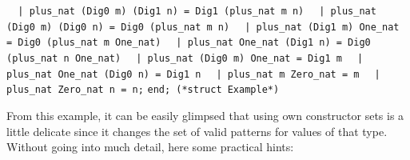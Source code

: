 \begin{isabellebody}
\begin{isamarkuptext}
\verb|  |\verb,|,\verb| plus_nat (Dig0 m) (Dig1 n) = Dig1 (plus_nat m n)|\newline%
\verb|  |\verb,|,\verb| plus_nat (Dig0 m) (Dig0 n) = Dig0 (plus_nat m n)|\newline%
\verb|  |\verb,|,\verb| plus_nat (Dig1 m) One_nat = Dig0 (plus_nat m One_nat)|\newline%
\verb|  |\verb,|,\verb| plus_nat One_nat (Dig1 n) = Dig0 (plus_nat n One_nat)|\newline%
\verb|  |\verb,|,\verb| plus_nat (Dig0 m) One_nat = Dig1 m|\newline%
\verb|  |\verb,|,\verb| plus_nat One_nat (Dig0 n) = Dig1 n|\newline%
\verb|  |\verb,|,\verb| plus_nat m Zero_nat = m|\newline%
\verb|  |\verb,|,\verb| plus_nat Zero_nat n = n;|\newline%
\newline%
\verb|end; (*struct Example*)|%
\end{isamarkuptext}%
\isamarkuptrue%
%
\endisatagquoteme
{\isafoldquoteme}%
%
\isadelimquoteme
%
\endisadelimquoteme
%
\begin{isamarkuptext}%
\noindent From this example, it can be easily glimpsed that using own constructor sets
  is a little delicate since it changes the set of valid patterns for values
  of that type.  Without going into much detail, here some practical hints:


\end{isamarkuptext}
\end{isabellebody}
